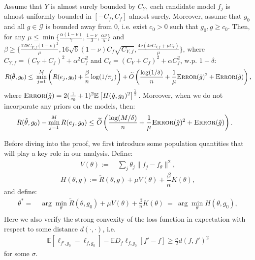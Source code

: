 \documentclass[12pt]{extarticle} %
\newcommand{\E}{\mathbb{E}}
\newcommand{\error}{\ensuremath{\textsc{Error}}}
\begin{document}
\begin{theorem}\label{thm:q_agg}
Assume that $Y$ is almost surely bounded by $C_Y$, each candidate model $f_j$ is almost uniformly bounded in $[-C_f,C_f]$ almost surely. Moreover, assume that $g_0$ and all $g\in \mathcal{G}$ is bounded away from 0, i.e. exist $c_0>0$ such that $g_0, g\geq c_0$. Then, for any $\mu \leq \min\{\frac{\alpha(1-\nu)}{7}, \frac{1-\nu}{3}, \frac{\alpha\nu}{5}\}$  and $\beta \geq \{ \frac{128C_{Y,f}(1-\nu)^2}{\mu}, 16\sqrt{6}(1-\nu)C_f \sqrt{C_{Y,f}},\frac{4\nu(4\nu C_{Y,f} + \mu C_{\ell})}{\mu}\}$, where $C_{Y,f} = (C_Y+C_f)^2+\alpha^2 C_f^2$ and $C_{\ell} = (C_Y+C_f)^2+\alpha C_f^2$, w.p. $1-\delta$:
\begin{align*}
    R(\hat{\theta}, g_0) \leq~& \min_{j=1}^M\left( R(e_j, g_0)  +\frac{\beta}{n}\log(1/\pi_j)\right) + \widetilde{O}\left(  \frac{\log(1/\delta)}{n} + \frac{1}{\mu}\error(\hat{g})^2 + \error(\hat{g})\right), \\
\end{align*} where $\error(\hat{g}) =2(\frac{1}{c_0} + 1)^2\mathbb{E}\left[H(\hat{g},g_0)^2\right]^{\frac{1}{2}}$.
Moreover, when we do not incorporate any priors on the models, then:
\begin{align*}
    R(\hat{\theta}, g_0) -\min_{j=1}^M R(e_j, g_0)\leq~& \widetilde{O}\left(\frac{\log(M/\delta)}{n} + \frac{1}{\mu}\error(\hat{g})^2 +\error(\hat{g})\right).
\end{align*}
\end{theorem}

Before diving into the proof, we first introduce some population quantities that will play a key role in our analysis. Define:
\begin{align*}
    V(\theta) :=~& \sum_{j} \theta_j \|f_j - f_{\theta}\|^2, 
\end{align*}
$$    H(\theta, g) := \tilde{R}(\theta, g) + \mu V(\theta) 
    + \frac{\beta}{n} K(\theta),$$
and define:
\begin{align*}
    \theta^* =~& \arg\min_{\theta} \tilde{R}(\theta, g_0) + \mu V(\theta) + \frac{\beta}{n} K(\theta) 
    ~=~ \arg\min_{\theta} H(\theta, g_0), \\
\end{align*}
Here we also verify the strong convexity of the loss function in expectation with respect to some distance $d(\cdot,\cdot)$, i.e.
\begin{align*}
    \E\left[\ell_{f', g_0} - \ell_{f, g_0}\right]  - \E D_{f}\ell_{f, g_0}[f'-f]\geq \frac{\sigma}{2}d(f,f')^2
\end{align*} for some $\sigma$.
\end{document}
